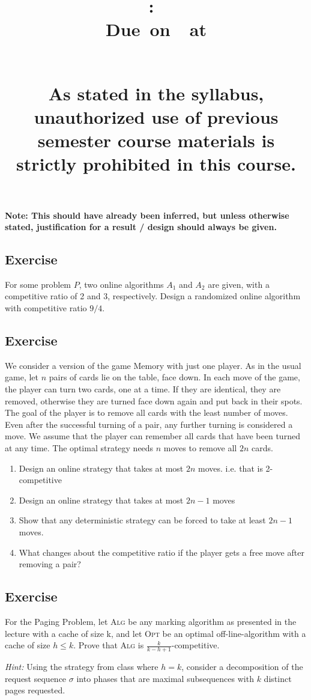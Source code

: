 \documentclass{article}
\title{
    \vspace{2in}
    \textbf{\hmwkClass:\ \hmwkTitle}\\
    \normalsize\vspace{0.1in}\small{Due\ on\ \hmwkDueDate\ at \hmwkDueTime}\\
    \vspace{0.1in}\large{\textit{\hmwkClassInstructor\ \hmwkSection}} \\
    \vspace{0.8in}
    \begin{minipage}[t]{0.4\columnwidth}
        {\footnotesize\textbf{As stated in the syllabus, unauthorized use of previous semester course materials is strictly prohibited in this course.
        }}
    \vspace{0.5in}
    \end{minipage}
    \vspace{0.8in}
    \author{\textbf{\hmwkAuthorName}}
    \date{}
}
\newcounter{counter}
\newcommand{\Exercise}{Exercise \stepcounter{counter}\thecounter}
\begin{document}
\maketitle
\pagebreak

\textbf{Note: This should have already been inferred, but unless otherwise stated, justification for a result / design should always be given.}

\subsection*{\Exercise}
  For some problem $P$, two online algorithms $A_1$ and $A_2$ are given, with a
  competitive ratio of 2 and 3, respectively. Design a randomized online
  algorithm with competitive ratio $9/4$.

\subsection*{\Exercise}
  We consider a version of the game Memory with just one player. As in the
  usual game, let $n$ pairs of cards lie on the table, face down. In each move
  of the game, the player can turn two cards, one at a time. If they are
  identical, they are removed, otherwise they are turned face down again and
  put back in their spots. The goal of the player is to remove all cards with
  the least number of moves. Even after the successful turning of a pair, any
  further turning is considered a move. We assume that the player can remember
  all cards that have been turned at any time. The optimal strategy
  needs $n$ moves to remove all $2n$ cards.
  \begin{enumerate}
    \item Design an online strategy that takes at most $2n$ moves. i.e. that is 2-competitive
    \item Design an online strategy that takes at most $2n-1$ moves
    \item Show that any deterministic strategy can be forced to take at least $2n-1$ moves.
    \item What changes about the competitive ratio if the player gets a free move after removing a pair?
  \end{enumerate}

\subsection*{\Exercise}
  For the Paging Problem, let \textsc{Alg} be any marking algorithm as
  presented in the lecture with a cache of size k, and let \textsc{Opt} be an optimal
  off-line-algorithm with a cache of size $h \leq k$. Prove that \textsc{Alg} is
  $\frac{k}{k-h+1}$-competitive.

  \vspace{2mm}
  \textit{Hint:} Using the strategy from class where $h=k$, consider a decomposition of
  the request sequence $\sigma$ into phases that are maximal subsequences with $k$
  distinct pages requested.
\end{document}
